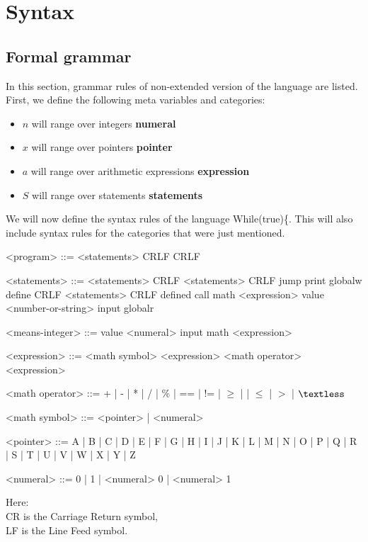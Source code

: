 \documentclass{article}
\begin{document}
\section{Syntax}
\subsection{Formal grammar}
In this section, grammar rules of non-extended version of the language are listed. First, we define the following meta variables and categories:
\begin{itemize}
    \item $n$ will range over integers \textbf{numeral}
    \item $x$ will range over pointers \textbf{pointer}
    \item $a$ will range over arithmetic expressions \textbf{expression}
    \item $S$ will range over statements \textbf{statements}
\end{itemize}

We will now define the syntax rules of the language While(true)\{. This will also include syntax rules for the categories that were just mentioned.



\begin{grammar}
<program> ::= <statements> CRLF CRLF

<statements> ::= <statements> CRLF <statements>
 CRLF jump
\alt print
\alt globalw
\alt define CRLF <statements> CRLF defined
\alt call
\alt math <expression>
\alt value <number-or-string>
\alt input
\alt globalr

<means-integer> ::= value <numeral>
\alt input
\alt math <expression>

<expression> ::= <math symbol>
\alt <expression> <math operator> <expression>

<math operator> ::= + | - | * | / | \% | == | != | $ \geq $ | | $ \leq $ | $ > $ | $\textless$

<math symbol> ::= <pointer> | <numeral>

<pointer> ::= A | B | C | D | E | F | G | H | I | J | K | L
| M | N | O | P | Q | R | S | T | U | V | W | X | Y | Z

<numeral> ::= 0 | 1 | <numeral> 0 | <numeral> 1 

\end{grammar}
Here:\\
CR is the Carriage Return symbol, \\
LF is the Line Feed symbol.\\
\end{document}
